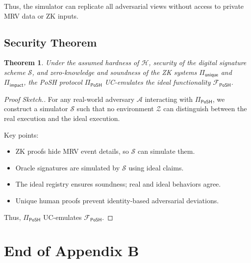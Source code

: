 \documentclass[11pt,a4paper]{report}
\newtheorem{theorem}{Theorem}[section]
\theoremstyle{definition}
\theoremstyle{remark}
\begin{document}
Thus, the simulator can replicate all adversarial views without access
to private MRV data or ZK inputs.

\section{Security Theorem}

\begin{theorem}
Under the assumed hardness of $\mathcal{H}$, security of the digital signature
scheme $\mathcal{S}$, and zero-knowledge and soundness of the ZK systems
$\Pi_{\textsf{unique}}$ and $\Pi_{\textsf{impact}}$, the PoSH protocol
$\Pi_{\textsf{PoSH}}$ UC-emulates the ideal functionality
$\mathcal{F}_{\textsf{PoSH}}$.
\end{theorem}

\begin{proof}[Proof Sketch.]
For any real-world adversary $\mathcal{A}$ interacting with
$\Pi_{\textsf{PoSH}}$, we construct a simulator $\mathcal{S}$ such that no
environment $\mathcal{Z}$ can distinguish between the real execution and the
ideal execution.

Key points:
\begin{itemize}[leftmargin=*]
  \item ZK proofs hide MRV event details, so $\mathcal{S}$ can simulate them.
  \item Oracle signatures are simulated by $\mathcal{S}$ using ideal claims.
  \item The ideal registry ensures soundness; real and ideal behaviors agree.
  \item Unique human proofs prevent identity-based adversarial deviations.
\end{itemize}

Thus, $\Pi_{\textsf{PoSH}}$ UC-emulates $\mathcal{F}_{\textsf{PoSH}}$.
\end{proof}

\chapter*{End of Appendix B}





\end{document}
